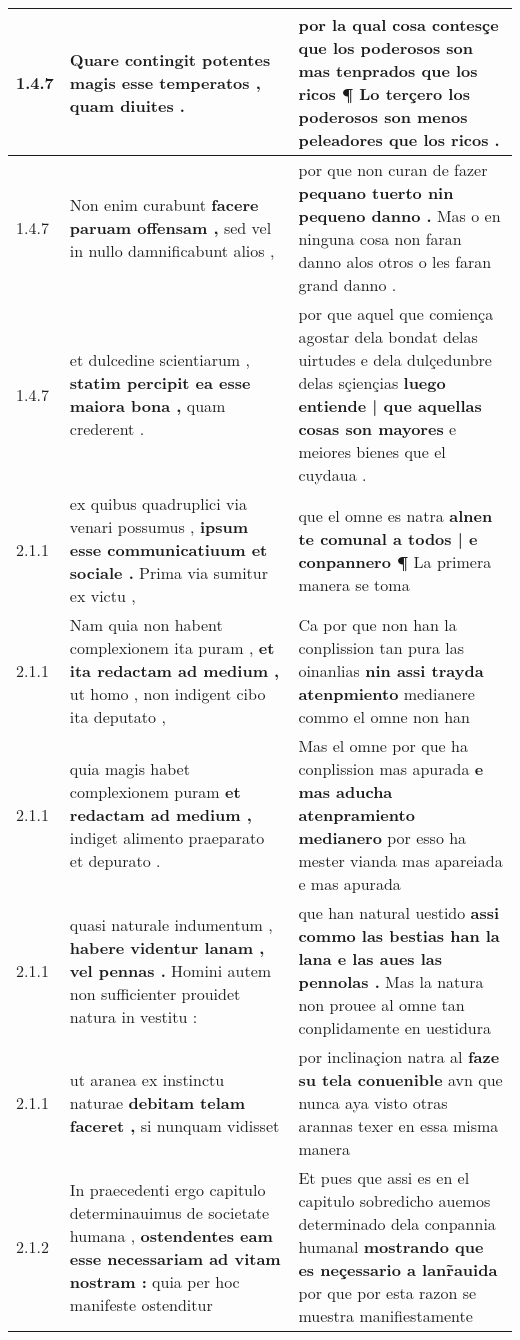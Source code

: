 \begin{tabular}{|p{1cm}|p{6.5cm}|p{6.5cm}|}
1.4.7 & Quare contingit potentes \textbf{ magis esse temperatos , } quam diuites . & por la qual cosa contesçe \textbf{ que los poderosos son mas tenprados que los ricos ¶ } Lo terçero los poderosos son menos peleadores que los ricos . \\\hline
1.4.7 & Non enim curabunt \textbf{ facere paruam offensam , } sed vel in nullo damnificabunt alios , & por que non curan de fazer \textbf{ pequano tuerto nin pequeno danno . } Mas o en ninguna cosa non faran danno alos otros o les faran grand danno . \\\hline
1.4.7 & et dulcedine scientiarum , \textbf{ statim percipit ea esse maiora bona , } quam crederent . & por que aquel que comiença agostar dela bondat delas uirtudes e dela dulçedunbre delas sçiençias \textbf{ luego entiende | que aquellas cosas son mayores } e meiores bienes que el cuydaua . \\\hline
2.1.1 & ex quibus quadruplici via venari possumus , \textbf{ ipsum esse communicatiuum et sociale . } Prima via sumitur ex victu , & que el omne es natra \textbf{ alnen te comunal a todos | e conpannero ¶ } La primera manera se toma \\\hline
2.1.1 & Nam quia non habent complexionem ita puram , \textbf{ et ita redactam ad medium , } ut homo , non indigent cibo ita deputato , & Ca por que non han la conplission tan pura las oinanlias \textbf{ nin assi trayda atenpmiento } medianere commo el omne non han \\\hline
2.1.1 & quia magis habet complexionem puram \textbf{ et redactam ad medium , } indiget alimento praeparato et depurato . & Mas el omne por que ha conplission mas apurada \textbf{ e mas aducha atenpramiento medianero } por esso ha mester vianda mas apareiada e mas apurada \\\hline
2.1.1 & quasi naturale indumentum , \textbf{ habere videntur lanam , vel pennas . } Homini autem non sufficienter prouidet natura in vestitu : & que han natural uestido \textbf{ assi commo las bestias han la lana e las aues las pennolas . } Mas la natura non prouee al omne tan conplidamente en uestidura \\\hline
2.1.1 & ut aranea ex instinctu naturae \textbf{ debitam telam faceret , } si nunquam vidisset & por inclinaçion natra al \textbf{ faze su tela conuenible } avn que nunca aya visto otras arannas texer en essa misma manera \\\hline
2.1.2 & In praecedenti ergo capitulo determinauimus de societate humana , \textbf{ ostendentes eam esse necessariam ad vitam nostram : } quia per hoc manifeste ostenditur & Et pues que assi es en el capitulo sobredicho auemos determinado dela conpannia humanal \textbf{ mostrando que es neçessario a lanr̃auida } por que por esta razon se muestra manifiestamente \\\hline

\end{tabular}
